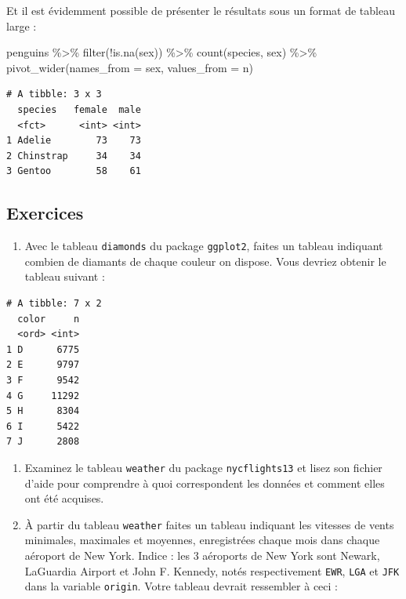 \documentclass[
  a4paper,
  DIV=11,
  numbers=noendperiod,
  oneside]{scrreprt}
\newenvironment{Shaded}{}{}
\newcommand{\AttributeTok}[1]{\textcolor[rgb]{0.84,0.23,0.29}{#1}}
\newcommand{\FunctionTok}[1]{\textcolor[rgb]{0.44,0.26,0.76}{#1}}
\newcommand{\NormalTok}[1]{\textcolor[rgb]{0.14,0.16,0.18}{#1}}
\newcommand{\SpecialCharTok}[1]{\textcolor[rgb]{0.00,0.36,0.77}{#1}}
\providecommand{\tightlist}{%
  \setlength{\itemsep}{0pt}\setlength{\parskip}{0pt}}\usepackage{longtable,booktabs,array}
\begin{document}
Et il est évidemment possible de présenter le résultats sous un format
de tableau large :

\begin{Shaded}
\begin{Highlighting}[]
\NormalTok{penguins }\SpecialCharTok{\%\textgreater{}\%} 
  \FunctionTok{filter}\NormalTok{(}\SpecialCharTok{!}\FunctionTok{is.na}\NormalTok{(sex)) }\SpecialCharTok{\%\textgreater{}\%} 
  \FunctionTok{count}\NormalTok{(species, sex) }\SpecialCharTok{\%\textgreater{}\%} 
  \FunctionTok{pivot\_wider}\NormalTok{(}\AttributeTok{names\_from =}\NormalTok{ sex,}
              \AttributeTok{values\_from =}\NormalTok{ n)}
\end{Highlighting}
\end{Shaded}

\begin{verbatim}
# A tibble: 3 x 3
  species   female  male
  <fct>      <int> <int>
1 Adelie        73    73
2 Chinstrap     34    34
3 Gentoo        58    61
\end{verbatim}

\hypertarget{Exo-10}{%
\subsection{Exercices}\label{Exo-10}}

\begin{enumerate}
\def\labelenumi{\arabic{enumi}.}
\tightlist
\item
  Avec le tableau \texttt{diamonds} du package \texttt{ggplot2}, faites
  un tableau indiquant combien de diamants de chaque couleur on dispose.
  Vous devriez obtenir le tableau suivant :
\end{enumerate}

\begin{verbatim}
# A tibble: 7 x 2
  color     n
  <ord> <int>
1 D      6775
2 E      9797
3 F      9542
4 G     11292
5 H      8304
6 I      5422
7 J      2808
\end{verbatim}

\begin{enumerate}
\def\labelenumi{\arabic{enumi}.}
\setcounter{enumi}{1}
\item
  Examinez le tableau \texttt{weather} du package \texttt{nycflights13}
  et lisez son fichier d'aide pour comprendre à quoi correspondent les
  données et comment elles ont été acquises.
\item
  À partir du tableau \texttt{weather} faites un tableau indiquant les
  vitesses de vents minimales, maximales et moyennes, enregistrées
  chaque mois dans chaque aéroport de New York. Indice : les 3 aéroports
  de New York sont Newark, LaGuardia Airport et John F. Kennedy, notés
  respectivement \texttt{EWR}, \texttt{LGA} et \texttt{JFK} dans la
  variable \texttt{origin}. Votre tableau devrait ressembler à ceci :
\end{enumerate}
\end{document}
